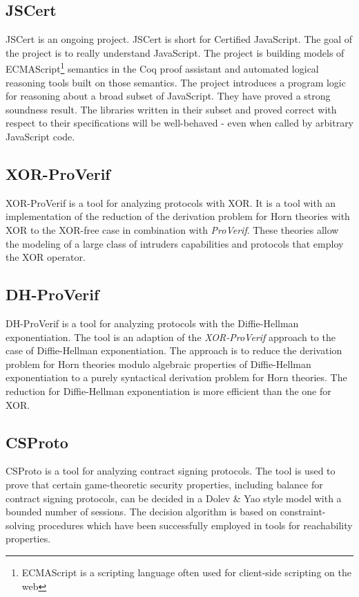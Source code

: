 \documentclass[twosided]{report}
\begin{document}
\subsection{JSCert}
JSCert is an ongoing project. JSCert is short for Certified JavaScript. The goal of the project is to really understand JavaScript. The project is building models of ECMAScript\footnote{ECMAScript is a scripting language often used for client-side scripting on the web} semantics in the Coq proof assistant and automated logical reasoning tools built on those semantics. The project introduces a program logic for reasoning about a broad subset of JavaScript. They have proved a strong soundness result. The libraries written in their subset and proved correct with respect to their specifications will be well-behaved - even when called by arbitrary JavaScript code.


\subsection{XOR-ProVerif}
XOR-ProVerif is a tool for analyzing protocols with XOR. It is a tool with an implementation of the reduction of the derivation problem for Horn theories with XOR to the XOR-free case in combination with \emph{ProVerif}. These theories allow the modeling of a large class of intruders capabilities and protocols that employ the XOR operator.

\subsection{DH-ProVerif}
DH-ProVerif is a tool for analyzing protocols with the Diffie-Hellman exponentiation. The tool is an adaption of the \emph{XOR-ProVerif} approach to the case of Diffie-Hellman exponentiation. The approach is to reduce the derivation problem for Horn theories modulo algebraic properties of Diffie-Hellman exponentiation to a purely syntactical derivation problem for Horn theories. The reduction for Diffie-Hellman exponentiation is more efficient than the one for XOR.

\subsection{CSProto}
CSProto is a tool for analyzing contract signing protocols. The tool is used to prove that certain game-theoretic security properties, including balance for contract signing protocols, can be decided in a Dolev \& Yao style model with a bounded number of sessions. The decision algorithm is based on constraint-solving procedures which have been successfully employed in tools for reachability properties.
\end{document}
